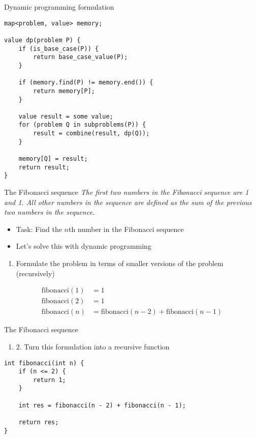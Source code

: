 \documentclass[12pt,t]{beamer}
\newcommand{\bi}{\begin{itemize}}
\newcommand{\ei}{\end{itemize}}
\newcommand{\be}{\begin{enumerate}}
\newcommand{\ee}{\end{enumerate}}
\begin{document}
\begin{frame}[fragile]{Dynamic programming formulation}
    \begin{verbatim}
map<problem, value> memory;

value dp(problem P) {
    if (is_base_case(P)) {
        return base_case_value(P);
    }

    if (memory.find(P) != memory.end()) {
        return memory[P];
    }

    value result = some value;
    for (problem Q in subproblems(P)) {
        result = combine(result, dp(Q));
    }

    memory[Q] = result;
    return result;
}
    \end{verbatim}
\end{frame}

\begin{frame}{The Fibonacci sequence}
    \vspace{5pt}
    \textit{The first two numbers in the Fibonacci sequence are 1 and 1. All
            other numbers in the sequence are defined as the sum of the previous two
            numbers in the sequence.}

    \vspace{5pt}
    \bi
        \item Task: Find the $n$th number in the Fibonacci sequence
        \item Let's solve this with dynamic programming
    \ei

    \vspace{5pt}
    \be
        \item Formulate the problem in terms of smaller versions of the problem (recursively)
    \ee

    \begin{align*}
        \mathrm{fibonacci}(1) &= 1\\
        \mathrm{fibonacci}(2) &= 1\\
        \mathrm{fibonacci}(n) &= \mathrm{fibonacci}(n - 2) + \mathrm{fibonacci}(n - 1)
    \end{align*}
\end{frame}

\begin{frame}[fragile]{The Fibonacci sequence}
    \be
        \item[2.] Turn this formulation into a recursive function
    \ee

    \begin{verbatim}
int fibonacci(int n) {
    if (n <= 2) {
        return 1;
    }

    int res = fibonacci(n - 2) + fibonacci(n - 1);

    return res;
}
    \end{verbatim}
\end{frame}
\end{document}
